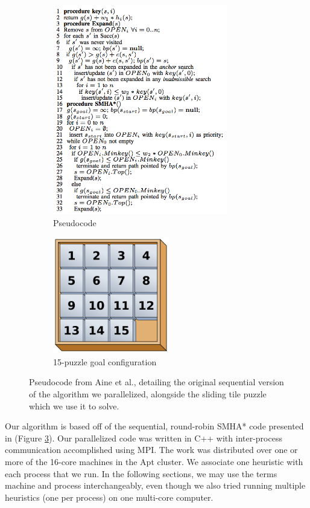 \documentclass[11pt]{article}
\begin{document}
{\begin{figure}
\centering
\begin{subfigure}{3in}
  \includegraphics[width=3in]{pseudocode}
  \caption{Pseudocode}
  \label{fig1}
\end{subfigure}
\begin{subfigure}{2in}
  \includegraphics[width=2in]{graphs/puzzle}
  \caption{15-puzzle goal configuration}
  \label{fig2}
\end{subfigure}
\caption{Pseudocode from Aine et al., detailing the original sequential version of the algorithm we parallelized, alongside the sliding tile puzzle which we use it to solve.}
\label{fig:pseudocode}
\end{figure}


Our algorithm is based off of the sequential, round-robin SMHA* code presented in \cite{Aine14} (Figure \ref{fig:pseudocode}). Our parallelized code was written in C++ with inter-process communication accomplished using MPI. The work was distributed over one or more of the 16-core machines in the Apt cluster. We associate one heuristic with each process that we run. In the following sections, we may use the terms machine and process interchangeably, even though we also tried running multiple heuristics (one per process) on one multi-core computer.

}
\end{document}
